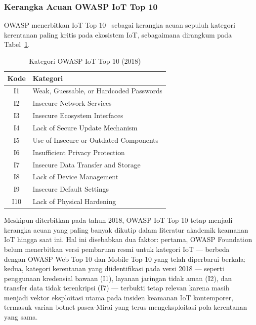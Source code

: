 \documentclass[conference]{IEEEtran}
\begin{document}
\subsubsection{Kerangka Acuan OWASP IoT Top 10}

OWASP menerbitkan IoT Top 10~\cite{owasp2018} sebagai kerangka acuan
sepuluh kategori kerentanan paling kritis pada ekosistem IoT,
sebagaimana dirangkum pada Tabel~\ref{tab:owasp_list}.

\begin{table}[htbp]
\caption{Kategori OWASP IoT Top 10 (2018)}
\label{tab:owasp_list}
\renewcommand{\arraystretch}{1.2}
\begin{tabularx}{\columnwidth}{|c|X|}
\hline
\textbf{Kode} & \textbf{Kategori} \\
\hline
I1  & Weak, Guessable, or Hardcoded Passwords \\
\hline
I2  & Insecure Network Services \\
\hline
I3  & Insecure Ecosystem Interfaces \\
\hline
I4  & Lack of Secure Update Mechanism \\
\hline
I5  & Use of Insecure or Outdated Components \\
\hline
I6  & Insufficient Privacy Protection \\
\hline
I7  & Insecure Data Transfer and Storage \\
\hline
I8  & Lack of Device Management \\
\hline
I9  & Insecure Default Settings \\
\hline
I10 & Lack of Physical Hardening \\
\hline
\end{tabularx}
\end{table}

Meskipun diterbitkan pada tahun 2018, OWASP IoT Top 10 tetap menjadi
kerangka acuan yang paling banyak dikutip dalam literatur akademik
keamanan IoT hingga saat ini. Hal ini disebabkan dua faktor: pertama,
OWASP Foundation belum menerbitkan versi pembaruan resmi untuk
kategori IoT --- berbeda dengan OWASP Web Top 10 dan Mobile Top 10
yang telah diperbarui berkala; kedua, kategori kerentanan yang
diidentifikasi pada versi 2018 --- seperti penggunaan kredensial bawaan
(I1), layanan jaringan tidak aman (I2), dan transfer data tidak terenkripsi
(I7) --- terbukti tetap relevan karena masih menjadi vektor eksploitasi
utama pada insiden keamanan IoT kontemporer, termasuk varian botnet
pasca-Mirai yang terus mengeksploitasi pola kerentanan yang sama.
\end{document}
